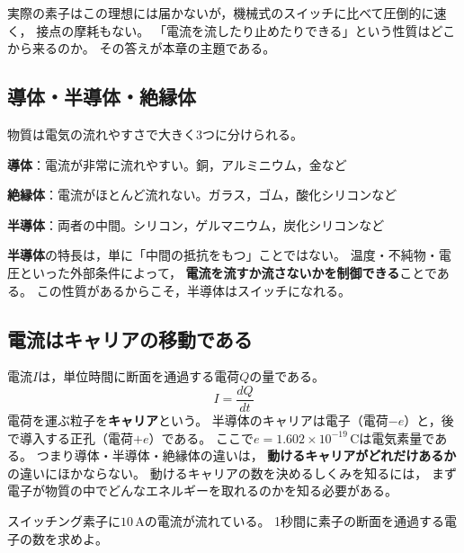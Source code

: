 実際の素子はこの理想には届かないが，機械式のスイッチに比べて圧倒的に速く，
接点の摩耗もない。
「電流を流したり止めたりできる」という性質はどこから来るのか。
その答えが本章の主題である。

\subsection{導体・半導体・絶縁体}

物質は電気の流れやすさで大きく3つに分けられる。

\begin{箇条書}
\item \textbf{導体}：電流が非常に流れやすい。銅，アルミニウム，金など
\item \textbf{絶縁体}：電流がほとんど流れない。ガラス，ゴム，酸化シリコンなど
\item \textbf{半導体}：両者の中間。シリコン，ゲルマニウム，炭化シリコンなど
\end{箇条書}

\textbf{半導体}の特長は，単に「中間の抵抗をもつ」ことではない。
温度・不純物・電圧といった外部条件によって，
\textbf{電流を流すか流さないかを制御できる}ことである。
この性質があるからこそ，半導体はスイッチになれる。

\subsection{電流はキャリアの移動である}

電流$I$は，単位時間に断面を通過する電荷$Q$の量である。
\begin{equation}
I = \frac{dQ}{dt}
\label{eq1.1}
\end{equation}
電荷を運ぶ粒子を\textbf{キャリア}という。
半導体のキャリアは電子（電荷$-e$）と，後で導入する正孔（電荷$+e$）である。
ここで$e = 1.602\times10^{-19}$\,Cは電気素量である。
つまり導体・半導体・絶縁体の違いは，
\textbf{動けるキャリアがどれだけあるか}の違いにほかならない。
動けるキャリアの数を決めるしくみを知るには，
まず電子が物質の中でどんなエネルギーを取れるのかを知る必要がある。

\begin{問}
\item スイッチング素子に$10$\,Aの電流が流れている。
1秒間に素子の断面を通過する電子の数を求めよ。
\end{問}

